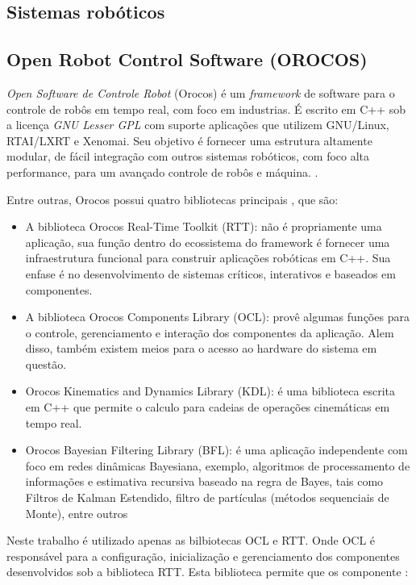 \documentclass[conference]{IEEEtran}
\begin{document}
\subsection{Sistemas robóticos}\label{subsec:robot_systems}

\subsection{Open Robot Control Software (OROCOS)}\label{subsec:orocos}

\textit{Open Software de Controle Robot} (Orocos) é um \textit{framework} de software para o controle de robôs em tempo real, com foco em industrias. É escrito em C++ sob a licença \textit{GNU Lesser GPL} com suporte aplicações que utilizem GNU/Linux, RTAI/LXRT e Xenomai. Seu objetivo é fornecer uma estrutura altamente modular, de fácil integração com outros sistemas robóticos, com foco alta performance, para um avançado controle de robôs e máquina. \cite{Orocos_manual}.

Entre outras, Orocos possui quatro bibliotecas principais \cite{Orocos_Project_IEEE}, que são:

\begin{itemize}
	\item A biblioteca Orocos Real-Time Toolkit (RTT): não é propriamente uma aplicação, sua função dentro do ecossistema do framework é fornecer uma infraestrutura funcional para construir aplicações robóticas em C++. Sua enfase é no desenvolvimento de sistemas críticos, interativos e baseados em componentes.
	\item A biblioteca Orocos Components Library (OCL): provê algumas funções para o controle, gerenciamento e interação dos componentes da aplicação. Alem disso, também existem meios para o acesso ao hardware do sistema em questão.
	\item Orocos Kinematics and Dynamics Library (KDL): é uma biblioteca escrita em C++ que permite o calculo para cadeias de operações cinemáticas em tempo real.
	\item Orocos Bayesian Filtering Library (BFL): é uma aplicação independente com foco em redes dinâmicas Bayesiana, exemplo, algoritmos de processamento de informações e estimativa recursiva baseado na regra de Bayes, tais como Filtros de Kalman Estendido, filtro de partículas (métodos sequenciais de Monte), entre outros
\end{itemize}

Neste trabalho é utilizado apenas as bilbiotecas OCL e RTT. Onde OCL é responsável para a configuração, inicialização e gerenciamento dos componentes desenvolvidos sob a biblioteca RTT. Esta biblioteca permite que os componente \cite{Orocos_manual}:
\end{document}
